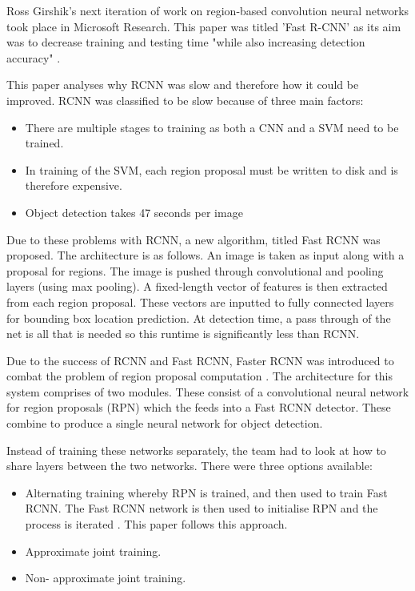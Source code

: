 Ross Girshik's next iteration of work on region-based convolution neural
networks took place in Microsoft Research. This paper was titled 'Fast R-CNN' as
its aim was to decrease training and testing time "while also increasing
detection accuracy" \parencite{fastRcnn}.

This paper analyses why RCNN \parencite{rcnn} was slow and therefore how it could be improved.
RCNN was classified to be slow because of three main factors:
\begin{itemize}
	\item{There are multiple stages to training as both a CNN and a SVM need to
		be trained.}
	\item{In training of the SVM, each region proposal must be written to disk
		and is therefore expensive.}
	\item{Object detection takes 47 seconds per image}
\end{itemize}

Due to these problems with RCNN, a new algorithm, titled Fast RCNN was proposed.
The architecture is as follows. An image is taken as input along with a
proposal for regions. The image is pushed through convolutional and pooling
layers (using max pooling). A fixed-length vector of features is then extracted
from each region proposal. These vectors are inputted to fully connected
layers for bounding box location prediction.
At detection time, a pass through of the net is all that is needed so this
runtime is significantly less than RCNN.

Due to the success of RCNN and Fast RCNN, Faster RCNN was introduced to combat
the problem of region proposal computation \parencite{fasterRcnn}.
The architecture for this system comprises of two modules. These consist of a
convolutional neural network for region proposals (RPN) which the feeds into a Fast
RCNN detector. These combine to produce a single neural network for object
detection.

Instead of training these networks separately, the team had to look at how to
share layers between the two networks. There were three options available:
\begin{itemize}
    \item{Alternating training whereby RPN is trained, and then used to train
        Fast RCNN. The Fast RCNN network is then used to initialise RPN and the
		process is iterated \parencite{fasterRcnn}. This paper follows this approach.}
    \item{Approximate joint training.}
    \item{Non- approximate joint training.}
\end{itemize}

